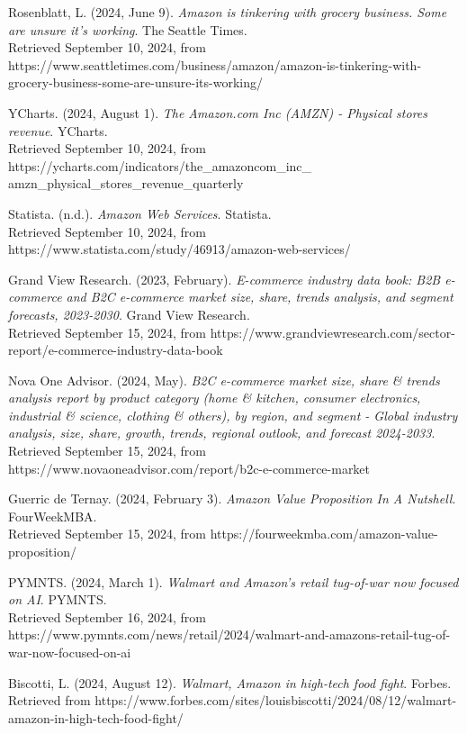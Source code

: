 \documentclass[12pt]{ctexart}
\begin{document}
\begin{thebibliography}{99}
     Rosenblatt, L. (2024, June 9). \textit{Amazon is tinkering with grocery business. Some are unsure it’s working}. The Seattle Times. \\ Retrieved September 10, 2024, from https://www.seattletimes.com/business/amazon/amazon-is-tinkering-with-grocery-business-some-are-unsure-its-working/ 

     YCharts. (2024, August 1). \textit{The Amazon.com Inc (AMZN) - Physical stores revenue}. YCharts.\\ Retrieved September 10, 2024, from https://ycharts.com/indicators/the\_amazoncom\_inc\_ \\ amzn\_physical\_stores\_revenue\_quarterly

     Statista. (n.d.). \textit{Amazon Web Services}. Statista. \\ Retrieved September 10, 2024, from https://www.statista.com/study/46913/amazon-web-services/

     Grand View Research. (2023, February). \textit{E-commerce industry data book: B2B e-commerce and B2C e-commerce market size, share, trends analysis, and segment forecasts, 2023-2030}. Grand View Research.\\ Retrieved September 15, 2024, from https://www.grandviewresearch.com/sector-report/e-commerce-industry-data-book

     Nova One Advisor. (2024, May). \textit{B2C e-commerce market size, share \& trends analysis report by product category (home \& kitchen, consumer electronics, industrial \& science, clothing \& others), by region, and segment - Global industry analysis, size, share, growth, trends, regional outlook, and forecast 2024-2033}. \\ Retrieved September 15, 2024, from  https://www.novaoneadvisor.com/report/b2c-e-commerce-market

     Guerric de Ternay. (2024, February 3). \textit{Amazon Value Proposition In A Nutshell}. FourWeekMBA. \\ Retrieved September 15, 2024, from  https://fourweekmba.com/amazon-value-proposition/

     PYMNTS. (2024, March 1). \textit{Walmart and Amazon’s retail tug-of-war now focused on AI}. PYMNTS. \\ Retrieved September 16, 2024, from  https://www.pymnts.com/news/retail/2024/walmart-and-amazons-retail-tug-of-war-now-focused-on-ai

     Biscotti, L. (2024, August 12). \textit{Walmart, Amazon in high-tech food fight}. Forbes. \\ Retrieved from https://www.forbes.com/sites/louisbiscotti/2024/08/12/walmart-amazon-in-high-tech-food-fight/


\end{thebibliography}
\end{document}
